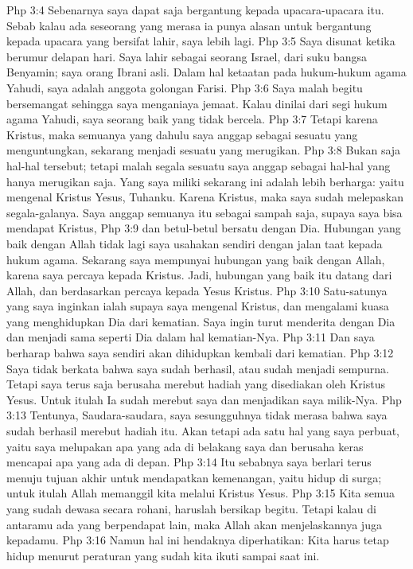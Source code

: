 Php 3:4  Sebenarnya saya dapat saja bergantung kepada upacara-upacara itu. Sebab kalau ada seseorang yang merasa ia punya alasan untuk bergantung kepada upacara yang bersifat lahir, saya lebih lagi.
Php 3:5  Saya disunat ketika berumur delapan hari. Saya lahir sebagai seorang Israel, dari suku bangsa Benyamin; saya orang Ibrani asli. Dalam hal ketaatan pada hukum-hukum agama Yahudi, saya adalah anggota golongan Farisi.
Php 3:6  Saya malah begitu bersemangat sehingga saya menganiaya jemaat. Kalau dinilai dari segi hukum agama Yahudi, saya seorang baik yang tidak bercela.
Php 3:7  Tetapi karena Kristus, maka semuanya yang dahulu saya anggap sebagai sesuatu yang menguntungkan, sekarang menjadi sesuatu yang merugikan.
Php 3:8  Bukan saja hal-hal tersebut; tetapi malah segala sesuatu saya anggap sebagai hal-hal yang hanya merugikan saja. Yang saya miliki sekarang ini adalah lebih berharga: yaitu mengenal Kristus Yesus, Tuhanku. Karena Kristus, maka saya sudah melepaskan segala-galanya. Saya anggap semuanya itu sebagai sampah saja, supaya saya bisa mendapat Kristus,
Php 3:9  dan betul-betul bersatu dengan Dia. Hubungan yang baik dengan Allah tidak lagi saya usahakan sendiri dengan jalan taat kepada hukum agama. Sekarang saya mempunyai hubungan yang baik dengan Allah, karena saya percaya kepada Kristus. Jadi, hubungan yang baik itu datang dari Allah, dan berdasarkan percaya kepada Yesus Kristus.
Php 3:10  Satu-satunya yang saya inginkan ialah supaya saya mengenal Kristus, dan mengalami kuasa yang menghidupkan Dia dari kematian. Saya ingin turut menderita dengan Dia dan menjadi sama seperti Dia dalam hal kematian-Nya.
Php 3:11  Dan saya berharap bahwa saya sendiri akan dihidupkan kembali dari kematian.
Php 3:12  Saya tidak berkata bahwa saya sudah berhasil, atau sudah menjadi sempurna. Tetapi saya terus saja berusaha merebut hadiah yang disediakan oleh Kristus Yesus. Untuk itulah Ia sudah merebut saya dan menjadikan saya milik-Nya.
Php 3:13  Tentunya, Saudara-saudara, saya sesungguhnya tidak merasa bahwa saya sudah berhasil merebut hadiah itu. Akan tetapi ada satu hal yang saya perbuat, yaitu saya melupakan apa yang ada di belakang saya dan berusaha keras mencapai apa yang ada di depan.
Php 3:14  Itu sebabnya saya berlari terus menuju tujuan akhir untuk mendapatkan kemenangan, yaitu hidup di surga; untuk itulah Allah memanggil kita melalui Kristus Yesus.
Php 3:15  Kita semua yang sudah dewasa secara rohani, haruslah bersikap begitu. Tetapi kalau di antaramu ada yang berpendapat lain, maka Allah akan menjelaskannya juga kepadamu.
Php 3:16  Namun hal ini hendaknya diperhatikan: Kita harus tetap hidup menurut peraturan yang sudah kita ikuti sampai saat ini.
